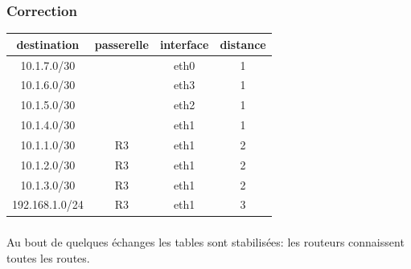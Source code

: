 \documentclass[svgnames,11pt]{beamer}
\begin{document}
\begin{frame}
    \frametitle{Correction}

    \begin{center}
        \begin{tabular}{|*{4}{c|}}
            \hline
            destination    & passerelle & interface & distance \\
            \hline
            10.1.7.0/30    &            & eth0      & 1        \\
            \hline
            10.1.6.0/30    &            & eth3      & 1        \\
            \hline
            10.1.5.0/30    &            & eth2      & 1        \\
            \hline
            10.1.4.0/30    &            & eth1      & 1        \\
            \hline
            10.1.1.0/30    &      R3      & eth1      & 2        \\
            \hline
            10.1.2.0/30    &     R3       & eth1      & 2        \\
            \hline
            10.1.3.0/30    &       R3     & eth1      & 2        \\
            \hline
            192.168.1.0/24    &     R3       & eth1      & 3        \\
            \hline
        \end{tabular}
    \end{center}

\end{frame}
\begin{frame}
    \frametitle{}

    \begin{aretenir}[Remarque]
        Au bout de quelques échanges les tables sont stabilisées: les routeurs connaissent toutes les routes.
    \end{aretenir}

\end{frame}
\end{document}
